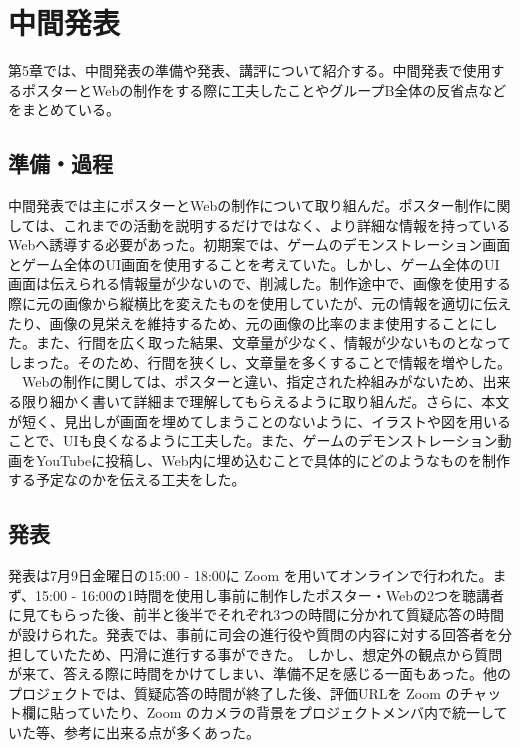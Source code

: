 \chapter{中間発表}
第5章では、中間発表の準備や発表、講評について紹介する。中間発表で使用するポスターとWebの制作をする際に工夫したことやグループB全体の反省点などをまとめている。
\section{準備・過程}
中間発表では主にポスターとWebの制作について取り組んだ。ポスター制作に関しては、これまでの活動を説明するだけではなく、より詳細な情報を持っているWebへ誘導する必要があった。初期案では、ゲームのデモンストレーション画面とゲーム全体のUI画面を使用することを考えていた。しかし、ゲーム全体のUI画面は伝えられる情報量が少ないので、削減した。制作途中で、画像を使用する際に元の画像から縦横比を変えたものを使用していたが、元の情報を適切に伝えたり、画像の見栄えを維持するため、元の画像の比率のまま使用することにした。また、行間を広く取った結果、文章量が少なく、情報が少ないものとなってしまった。そのため、行間を狭くし、文章量を多くすることで情報を増やした。\\
　Webの制作に関しては、ポスターと違い、指定された枠組みがないため、出来る限り細かく書いて詳細まで理解してもらえるように取り組んだ。さらに、本文が短く、見出しが画面を埋めてしまうことのないように、イラストや図を用いることで、UIも良くなるように工夫した。また、ゲームのデモンストレーション動画をYouTubeに投稿し、Web内に埋め込むことで具体的にどのようなものを制作する予定なのかを伝える工夫をした。

\section{発表}
発表は7月9日金曜日の15:00 - 18:00に Zoom を用いてオンラインで行われた。まず、15:00 - 16:00の1時間を使用し事前に制作したポスター・Webの2つを聴講者に見てもらった後、前半と後半でそれぞれ3つの時間に分かれて質疑応答の時間が設けられた。発表では、事前に司会の進行役や質問の内容に対する回答者を分担していたため、円滑に進行する事ができた。
しかし、想定外の観点から質問が来て、答える際に時間をかけてしまい、準備不足を感じる一面もあった。他のプロジェクトでは、質疑応答の時間が終了した後、評価URLを Zoom のチャット欄に貼っていたり、Zoom のカメラの背景をプロジェクトメンバ内で統一していた等、参考に出来る点が多くあった。

\newpage
